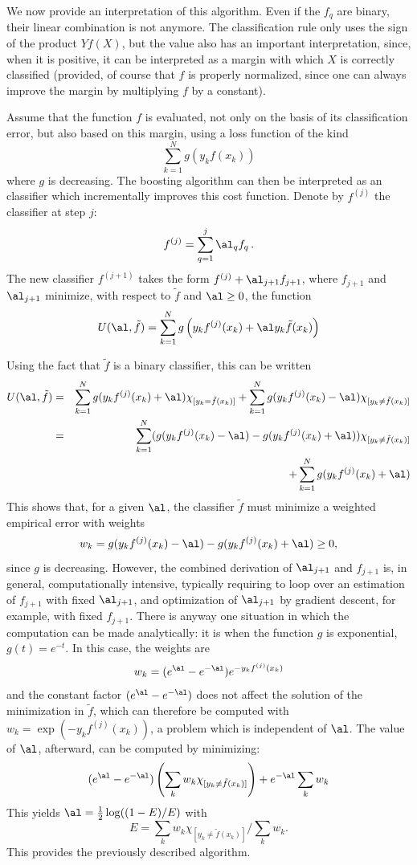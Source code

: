 We now provide an interpretation of this algorithm. Even if the $f_q$ are binary, their linear combination is not
anymore. The classification rule only uses the sign of the product $Yf(X)$, but the value also has an
important interpretation, since, when it is positive, it can be interpreted as a margin with which
$X$ is correctly classified (provided, of course that $f$ is properly
normalized, since one can always improve the margin by multiplying $f$
by a constant). 

Assume that the function $f$ is evaluated, not only on the basis of
its classification error, but also based on this margin,
using a loss function of the kind
$$
\sum_{k=1}^N g(y_kf(x_k))
$$
where $g$ is decreasing. The boosting algorithm can then be interpreted as an classifier which
incrementally improves this cost function.
Denote by
$f^{(j)}$ the  classifier at step $j$:
$$
f^{(j)} = \sum_{q=1}^j \al_q f_q\,.
$$
The new classifier $f^{(j+1)}$ takes the form $f^{(j)} + \al_{j+1}
f_{j+1}$, where  
$f_{j+1}$ and $\al_{j+1}$ minimize, with respect
to $\tilde f$ and $\al \geq 0$, the function
$$
U(\al, \tilde f) = \sum_{k=1}^N g\left(y_kf^{(j)}(x_k) + \al y_k \tilde
f(x_k)\right)
$$

Using the fact that $\tilde f$ is a binary classifier, this can be written
\begin{eqnarray*}
U(\al, \tilde f) &=& \sum_{k=1}^N g(y_kf^{(j)}(x_k) + \al) \chi_{[y_k
= \tilde f(x_k)]} + \sum_{k=1}^N g(y_kf^{(j)}(x_k) - \al) \chi_{[y_k
\neq \tilde f(x_k)]}\\
&=& \sum_{k=1}^N (g(y_kf^{(j)}(x_k) - \al) - g(y_kf^{(j)}(x_k) + \al)) \chi_{[y_k
\neq \tilde f(x_k)]} \\
&&+ \sum_{k=1}^N g(y_kf^{(j)}(x_k) + \al)
\end{eqnarray*}
This shows that, for a given $\al$, the classifier $\tilde f$ must
minimize a weighted empirical error with weights
$$ w_k  = g(y_kf^{(j)}(x_k) - \al) - g(y_kf^{(j)}(x_k) + \al) \geq 0,$$
since $g$ is decreasing. 
However, the combined derivation of $\al_{j+1}$ and $f_{j+1}$ is, in general, computationally intensive, typically requiring to  loop over an estimation of
$f_{j+1}$ with fixed $\al_{j+1}$, and optimization of $\al_{j+1}$
by gradient descent, for example, with fixed $f_{j+1}$. There is anyway one situation in which the
computation can be made analytically: it is when the function $g$ is
exponential, $g(t) = e^{- t}$. In this case, the weights are
$$w_k = (e^{\al} - e^{-\al})   e^{- y_k f^{(j)}(x_k)}$$
and the constant factor $(e^{\al} - e^{-\al})$ does not affect
the solution of the minimization in $\tilde f$, which can therefore be
computed with
$w_k = \exp(- y_k f^{(j)}(x_k))$, a problem which is independent of $\al$. The value of $\al$, afterward,
can be computed by  minimizing:
$$
(e^{\al} - e^{-\al}) \left(\sum_k w_k \chi_{[y_k
\neq \tilde f(x_k)]}\right) + e^{-\al} \sum_k w_k
$$
This yields $ \al = \frac{1}{2} \log((1-E)/E)$ with
$$
E = \sum_k w_k \chi_{[y_k
\neq \tilde f(x_k)]}/ \sum_k w_k.
$$
This provides the previously described algorithm.

